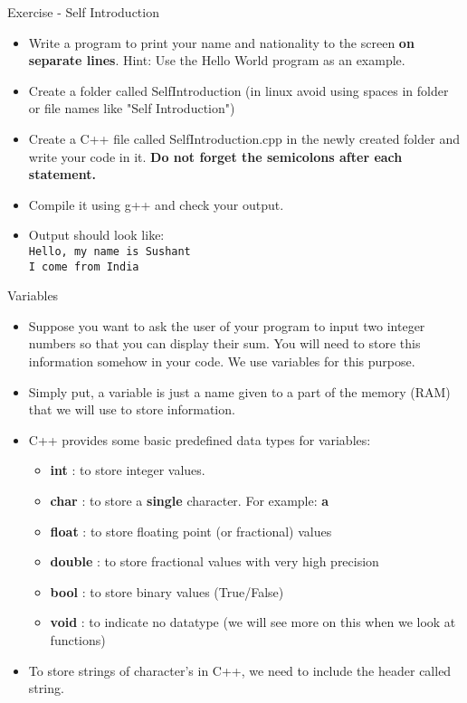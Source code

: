 \documentclass[aspectratio=169]{beamer}
\begin{document}
\begin{frame}[fragile]{Exercise - Self Introduction}
	\begin{itemize}
		\item Write a program to print your name and nationality to the screen \textbf{on separate lines}. Hint: Use the Hello World program as an example.
		\item Create a folder called SelfIntroduction (in linux avoid using spaces in folder or file names like "Self Introduction")
		\item Create a C++ file called SelfIntroduction.cpp in the newly created folder and write your code in it. \textbf{Do not forget the semicolons after each statement.}
		\item Compile it using g++ and check your output.
		\item Output should look like: \\ \verb|Hello, my name is Sushant| \\ \verb|I come from India|
	\end{itemize}
\end{frame}

\begin{frame}[fragile]{Variables}
	\begin{itemize}
		\item Suppose you want to ask the user of your program to input two integer numbers so that you can display their sum. You will need to store this information somehow in your code. We use variables for this purpose.
		\item Simply put, a variable is just a name given to a part of the memory (RAM) that we will use to store information.
		\item C++ provides some basic predefined data types for variables:
		\begin{itemize}
			\item \textbf{int} : to store integer values.
			\item \textbf{char} : to store a \textbf{single} character. For example: \textbf{a}
			\item \textbf{float} : to store floating point (or fractional) values
			\item \textbf{double} : to store fractional values with very high precision
			\item \textbf{bool} : to store binary values (True/False)
			\item \textbf{void} : to indicate no datatype (we will see more on this when we look at functions)
		\end{itemize}
		\item To store strings of character's in C++, we need to include the header called string.
	\end{itemize}
\end{frame}
\end{document}
